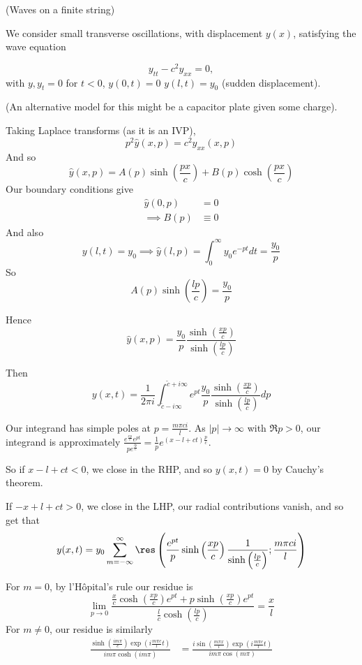 \documentclass[a4paper]{article}
\begin{document}
\begin{eg} (Waves on a finite string)

	We consider small transverse oscillations, with displacement $y(x)$, satisfying the wave equation

\[
y_{t t} - c^2 y_{x x} = 0
,\] with $y, y_t = 0$ for $t < 0$, $y(0,t) = 0$  $y(l, t) = y_0$ (sudden displacement). 

(An alternative model for this might be a capacitor plate given some charge).

Taking Laplace transforms (as it is an IVP),
\[
	p^2 \hat{y}(x, p) = c^2 \hat{y}_{x x}(x,p)
\] 
And so 
\[
	\hat{y}(x,p) = A(p) \sinh\left( \frac{px}{c} \right) + B(p) \cosh\left( \frac{px}{c} \right) 
\] 
Our boundary conditions give
\begin{align*}
	\hat{y}(0,p) &= 0 \\
	\implies B(p) &\equiv 0
\end{align*}
And also
\[
	y(l,t) = y_0 \implies \hat{y}(l,p) = \int_0^{\infty} y_0 e^{-pt} dt = \frac{y_0}{p}
\]
So  \[
	A(p) \sinh\left( \frac{lp}{c} \right) = \frac{y_0}{p}
\] 

Hence \[
	\hat{y}(x, p) = \frac{y_0}{p} \frac{\sinh\left( \frac{xp}{c} \right) }{\sinh \left( \frac{lp}{c} \right) }
\] 

Then 
\[
	y(x,t) = \frac{1}{2\pi i} \int_{\tilde{c} - i\infty}^{\tilde{c} + i\infty} e^{pt} \frac{y_0}{p} \frac{\sinh \left( \frac{xp}{c} \right) }{\sinh\left( \frac{lp}{c} \right) } dp
\] 
	
Our integrand has simple poles at $p = \frac{m \pi c i}{l}$. As $|p| \to \infty$ with $\Re p >0$, our integrand is approximately $\frac{e^{\frac{xp}{c}}e^{pt}}{pe^{\frac{lp}{c}}} = \frac{1}{p} e^{(x-l+ct)\frac{p}{c}}$.

So if $x - l + ct <0$, we close in the RHP, and so $y(x,t) = 0$ by Cauchy's theorem.

If $-x + l + ct > 0$, we close in the LHP, our radial contributions vanish, and so get that 
\begin{align*}
	y(x,t) = y_0 \sum_{m=-\infty}^{\infty} \res\left( \frac{e^{pt}}{p} \sinh\left( \frac{xp}{c} \right) \frac{1}{\sinh\left( \frac{lp}{c} \right) } ; \frac{m\pi c i}{l}\right)
\end{align*} 

For $m=0$, by l'H\^{o}pital's rule our residue is \[
		\lim_{p\to 0} \frac{\frac{x}{c} \cosh(\frac{xp}{c}) e^{pt} + p\sinh(\frac{xp}{c}) e^{pt}}{\frac{l}{c} \cosh(\frac{lp}{c})} = \frac{x}{l}
	\] 
For $m \neq 0$, our residue is similarly
\begin{align*}
	\frac{\sinh(\frac{im \pi}{c}) \exp(i \frac{m\pi c}{l} t) }{im \pi \cosh(i m \pi)} &= \frac{i \sin(\frac{m\pi x}{l}) \exp(i \frac{m\pi c}{l}t)}{i m \pi \cos(m\pi)} \\
\end{align*}


\end{eg}
\end{document}
